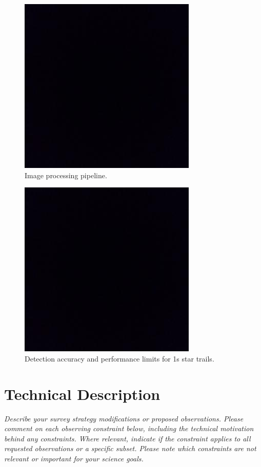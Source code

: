 \documentclass[12pt, letterpaper]{article}
\begin{document}
\begin{figure}[htb!]
\center
\includegraphics{bbox.jpeg}
\caption{Image processing pipeline.}
\label{fig:pipeline}
\end{figure}

\begin{figure}[htb!]
\center
\includegraphics{bbox.jpeg}
\caption{Detection accuracy and performance limits for 1s star trails.}
\label{fig:shortlimit}
\end{figure}

\vspace{.6in}
\newpage
\section{Technical Description}
\label{sec:technical}
\begin{footnotesize}
{\it Describe your survey strategy modifications or proposed observations. Please comment on each observing constraint
below, including the technical motivation behind any constraints. Where relevant, indicate
if the constraint applies to all requested observations or a specific subset. Please note which 
constraints are not relevant or important for your science goals.}
\end{footnotesize}
\end{document}
